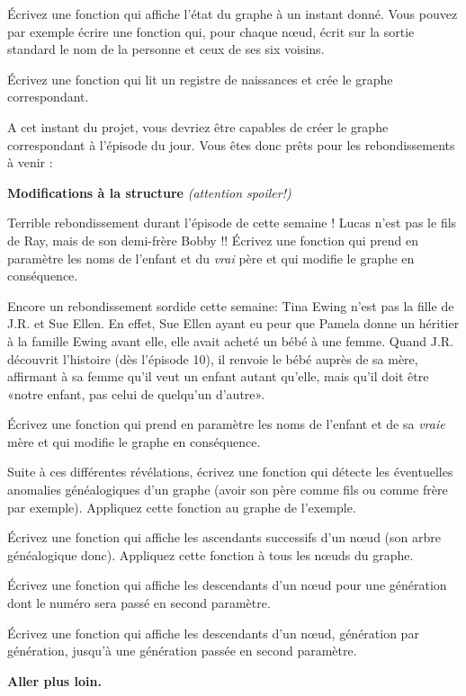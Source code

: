 \documentclass[10pt]{article}\usepackage[correction]{exemptty}
\begin{document}
\Question Écrivez une fonction qui affiche l'état du graphe à un instant
donné. Vous pouvez par exemple écrire une fonction qui, pour chaque nœud, écrit
sur la sortie standard le nom de la personne et ceux de ses six voisins.

\Question Écrivez une fonction qui lit un registre de naissances et crée le
graphe correspondant.

A cet instant du projet, vous devriez être capables de créer le graphe
correspondant à l'épisode du jour. Vous êtes donc prêts pour les
rebondissements à venir :

\Exercice\textbf{Modifications à la structure} \textit{(attention spoiler!)}

\Question Terrible rebondissement durant l'épisode de cette semaine ! Lucas
n'est pas le fils de Ray, mais de son demi-frère Bobby !! Écrivez une fonction
qui prend en paramètre les noms de l'enfant et du \emph{vrai} père et qui
modifie le graphe en conséquence.

\Question Encore un rebondissement sordide cette semaine: Tina Ewing n'est pas
la fille de J.R. et Sue Ellen. En effet, Sue Ellen ayant eu peur que Pamela
donne un héritier à la famille Ewing avant elle, elle avait acheté un bébé à
une femme. Quand J.R. découvrit l'histoire (dès l'épisode 10), il renvoie le
bébé auprès de sa mère, affirmant à sa femme qu'il veut un enfant autant
qu'elle, mais qu'il doit être «notre enfant, pas celui de quelqu'un d'autre».

Écrivez une fonction qui prend en paramètre les noms de l'enfant et de sa
\emph{vraie} mère et qui modifie le graphe en conséquence.

\Question Suite à ces différentes révélations, écrivez une fonction qui détecte
les éventuelles anomalies généalogiques d'un graphe (avoir son père comme fils
ou comme frère par exemple). Appliquez cette fonction au graphe de l'exemple.

\Question Écrivez une fonction qui affiche les ascendants successifs d'un nœud
(son arbre généalogique donc). Appliquez cette fonction à tous les nœuds du
graphe.

\Question Écrivez une fonction qui affiche les descendants d'un nœud pour une
génération dont le numéro sera passé en second paramètre.

\Question Écrivez une fonction qui affiche les descendants d'un nœud, génération
par génération, jusqu'à une génération passée en second paramètre.

\Exercice\textbf{Aller plus loin.}
\end{document}
